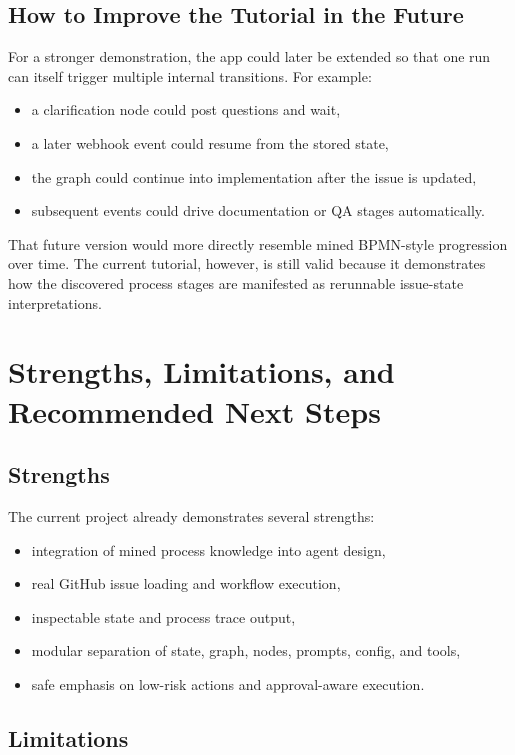 \documentclass[11pt,a4paper]{article}
\begin{document}
\subsection{How to Improve the Tutorial in the Future}

For a stronger demonstration, the app could later be extended so that one run can itself trigger multiple internal transitions. For example:
\begin{itemize}
    \item a clarification node could post questions and wait,
    \item a later webhook event could resume from the stored state,
    \item the graph could continue into implementation after the issue is updated,
    \item subsequent events could drive documentation or QA stages automatically.
\end{itemize}

That future version would more directly resemble mined BPMN-style progression over time. The current tutorial, however, is still valid because it demonstrates how the discovered process stages are manifested as rerunnable issue-state interpretations.

\section{Strengths, Limitations, and Recommended Next Steps}

\subsection{Strengths}

The current project already demonstrates several strengths:
\begin{itemize}
    \item integration of mined process knowledge into agent design,
    \item real GitHub issue loading and workflow execution,
    \item inspectable state and process trace output,
    \item modular separation of state, graph, nodes, prompts, config, and tools,
    \item safe emphasis on low-risk actions and approval-aware execution.
\end{itemize}

\subsection{Limitations}
\end{document}

